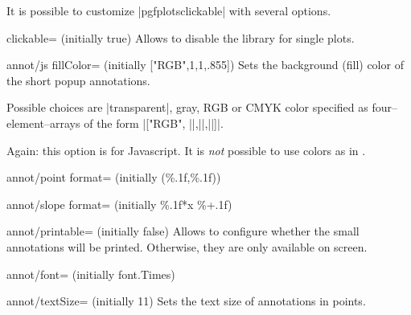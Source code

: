 It is possible to customize |pgfplotsclickable| with several options.

\begin{pgfplotskey}{clickable= (initially true)}
	Allows to disable the library for single plots.
\end{pgfplotskey}

\begin{pgfplotskey}{annot/js fillColor= (initially ["RGB",1,1,.855])}
	Sets the background (fill) color of the short popup annotations. 
	
	Possible choices are |transparent|, gray, RGB or CMYK color specified as four--element--arrays of the form
	|["RGB", ||,||,||]|.

	Again: this option is for Javascript. It is \emph{not} possible to use colors as in \pgfname.
\end{pgfplotskey}

\begin{pgfplotskey}{annot/point format= (initially {(\%.1f,\%.1f)})}
\end{pgfplotskey}

\begin{pgfplotskey}{annot/slope format= (initially \%.1f*x \%+.1f)}
\end{pgfplotskey}

\begin{pgfplotskey}{annot/printable= (initially false)}
	Allows to configure whether the small annotations will be printed. Otherwise, they are only available on screen.
\end{pgfplotskey}

\begin{pgfplotskey}{annot/font= (initially font.Times)}
	
\end{pgfplotskey}

\begin{pgfplotskey}{annot/textSize= (initially 11)}
	Sets the text size of annotations in points.
\end{pgfplotskey}
